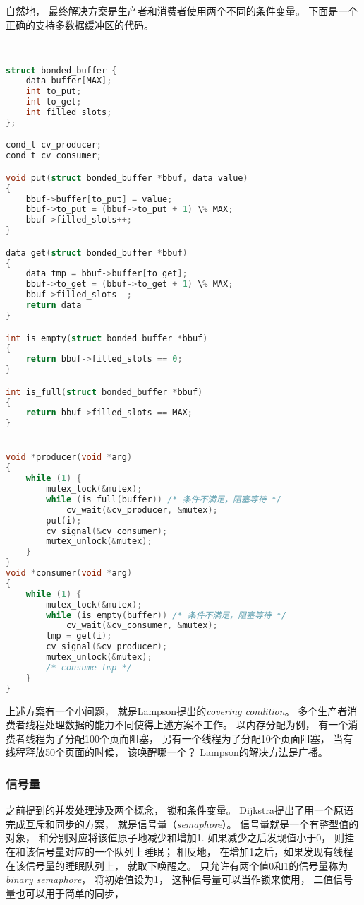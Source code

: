自然地，
最终解决方案是生产者和消费者使用两个不同的条件变量。
下面是一个正确的支持多数据缓冲区的代码。
\begin{lstlisting}[language=C]


struct bonded_buffer {
	data buffer[MAX];
	int to_put;
	int to_get;
	int filled_slots;
};

cond_t cv_producer;
cond_t cv_consumer;

void put(struct bonded_buffer *bbuf, data value)
{
	bbuf->buffer[to_put] = value;
	bbuf->to_put = (bbuf->to_put + 1) \% MAX;
	bbuf->filled_slots++;
}

data get(struct bonded_buffer *bbuf)
{
	data tmp = bbuf->buffer[to_get];
	bbuf->to_get = (bbuf->to_get + 1) \% MAX;
	bbuf->filled_slots--;
	return data
}

int is_empty(struct bonded_buffer *bbuf)
{
	return bbuf->filled_slots == 0;
}

int is_full(struct bonded_buffer *bbuf)
{
	return bbuf->filled_slots == MAX;
}


void *producer(void *arg)
{
	while (1) {
		mutex_lock(&mutex);
		while (is_full(buffer)) /* 条件不满足，阻塞等待 */
			cv_wait(&cv_producer, &mutex);
		put(i);
		cv_signal(&cv_consumer);
		mutex_unlock(&mutex);
	}
}
void *consumer(void *arg)
{
	while (1) {
		mutex_lock(&mutex);
		while (is_empty(buffer)) /* 条件不满足，阻塞等待 */
			cv_wait(&cv_consumer, &mutex);
		tmp = get(i);
		cv_signal(&cv_producer);
		mutex_unlock(&mutex);
		/* consume tmp */
	}
}
\end{lstlisting}

上述方案有一个小问题，
就是Lampson提出的{\em covering condition}。
多个生产者消费者线程处理数据的能力不同使得上述方案不工作。
以内存分配为例，
有一个消费者线程为了分配100个页而阻塞，
另有一个线程为了分配10个页面阻塞，
当有线程释放50个页面的时候，
该唤醒哪一个？
Lampson的解决方法是广播。

\subsubsection{信号量}
之前提到的并发处理涉及两个概念，
锁和条件变量。
Dijkstra提出了用一个原语完成互斥和同步的方案，
就是信号量（{\em semaphore}）。
信号量就是一个有整型值的对象，
和分别对应将该值原子地减少和增加1.
如果减少之后发现值小于0，
则挂在和该信号量对应的一个队列上睡眠；
相反地，
在增加1之后，如果发现有线程在该信号量的睡眠队列上，
就取下唤醒之。
只允许有两个值0和1的信号量称为{\em binary semaphore}，
将初始值设为1，
这种信号量可以当作锁来使用，
二值信号量也可以用于简单的同步，

